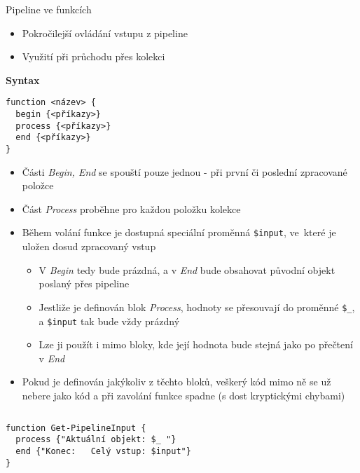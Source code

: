 \documentclass[main.tex]{subfiles}
\begin{document}
\begin{frame}{Pipeline ve funkcích}
  \vspace{-5mm}
  \begin{itemize}
  \item Pokročilejší ovládání vstupu z pipeline
  \item Využití při průchodu přes kolekci\\[3mm]
\end{itemize}

\textbf{Syntax}
  \begin{verbatim}
function <název> {
  begin {<příkazy>}
  process {<příkazy>}
  end {<příkazy>}
}
\end{verbatim}
\begin{itemize}
  \item Části \textit{Begin, End} se spouští pouze jednou - při první či poslední zpracované položce
  \item Část \textit{Process} proběhne pro každou položku kolekce
    \framebreak
  \item Během volání funkce je dostupná speciální proměnná \texttt{\$input}, ve~které je uložen dosud zpracovaný vstup
    \begin{itemize}
      \item V \textit{Begin} tedy bude prázdná, a v \textit{End} bude obsahovat původní objekt poslaný přes pipeline
      \item Jestliže je definován blok \textit{Process}, hodnoty se přesouvají do proměnné \texttt{\$\_}, a \texttt{\$input} tak bude vždy prázdný
      \item Lze ji použít i mimo bloky, kde její hodnota bude stejná jako po přečtení v \textit{End}
    \end{itemize}
  \item Pokud je definován jakýkoliv z těchto bloků, veškerý kód mimo ně se už nebere jako kód a při zavolání funkce spadne (s dost kryptickými chybami)
\end{itemize}
\vspace{-7mm}
\begin{columns}[t]
  \begin{column}{0.50\textwidth}
 \begin{verbatim}
function Get-PipelineInput {
  process {"Aktuální objekt: $_ "}
  end {"Konec:   Celý vstup: $input"}
}
\end{verbatim}
\end{column}
  \begin{column}{0.53\textwidth}

\end{column}
\end{columns}
\end{frame}
\end{document}
